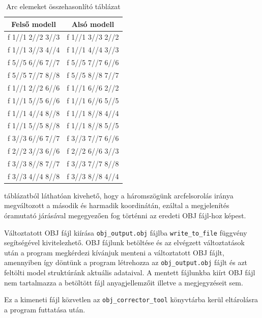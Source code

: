 \newpage

\begin{table}[h]
\centering
\caption{Arc elemeket összehasonlító táblázat}
\bigskip
\begin{tabular}{|c|c|}
Felső modell& Alsó modell \\
\hline
f  1//1 2//2 3//3 & f  1//1 3//3 2//2 \\
f  1//1 3//3 4//4 & f  1//1 4//4 3//3 \\
f  5//5 6//6 7//7 & f  5//5 7//7 6//6 \\
f  5//5 7//7 8//8 & f  5//5 8//8 7//7 \\ 
f  1//1 2//2 6//6 & f  1//1 6//6 2//2 \\
f  1//1 5//5 6//6 & f  1//1 6//6 5//5 \\
f  1//1 4//4 8//8 & f  1//1 8//8 4//4 \\
f  1//1 5//5 8//8 & f  1//1 8//8 5//5 \\
f  3//3 6//6 7//7 & f  3//3 7//7 6//6 \\
f  2//2 3//3 6//6 & f  2//2 6//6 3//3 \\
f  3//3 8//8 7//7 & f  3//3 7//7 8//8 \\
f  3//3 4//4 8//8 & f  3//3 8//8 4//4 \\
\hline
\end{tabular}
\label{fig:bej3}
\end{table}
\bigskip 

 táblázatból láthatóan kivehető, hogy a háromszögünk arcfelsorolás iránya megváltozott a második és harmadik koordinátán, ezáltal a megjelenítés óramutató járásával megegyezően fog történni az eredeti OBJ fájl-hoz képest.

Változtatott OBJ fájl kiírása \texttt{obj\_output.obj} fájlba \texttt{write\_to\_file} függvény segítségével kivitelezhető. OBJ fájlunk betöltése és az elvégzett változtatások után a program megkérdezi kívánjuk menteni a változtatott OBJ fájlt, amennyiben így döntünk a program létrehozza az \texttt{obj\_output.obj} fájlt és azt feltölti model struktúránk aktuális adataival. A mentett fájlunkba kiírt OBJ fájl nem tartalmazza a betöltött fájl anyagjellemzőit illetve a megjegyzéseit sem.
\bigskip
{}
\bigskip

Ez a kimeneti fájl közvetlen az \texttt{obj\_corrector\_tool} könyvtárba kerül eltárolásra a program futtatása után.






